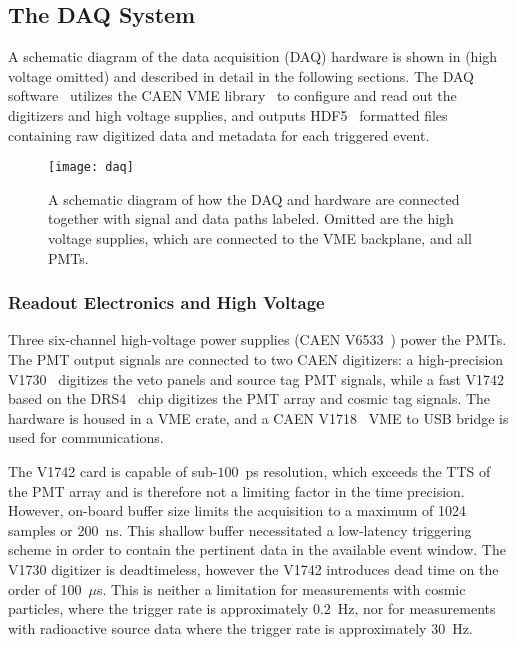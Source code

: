 \subsection{The DAQ System \label{sec:daq}}

A schematic diagram of the data acquisition (DAQ) hardware is shown in   (high voltage omitted) and described in detail in the following sections. 
The DAQ software~\cite{wblsdaq} utilizes the CAEN VME library~\cite{caen-vme} to configure and read out the digitizers and high voltage supplies, and outputs HDF5~\cite{hdf5} formatted files containing raw digitized data and metadata for each triggered event.

\begin{figure}
\centering
\texttt{[image: daq]}
\caption{A schematic diagram of how the DAQ and hardware are connected together with signal and data paths labeled. Omitted are the high voltage supplies, which are connected to the VME backplane, and all PMTs.}
\label{fig:daq}
\end{figure}


\subsubsection{Readout Electronics and High Voltage}
Three six-channel high-voltage power supplies (CAEN V6533~\cite{v6533}) power the PMTs. 
The PMT output signals are connected to two CAEN digitizers: a high-precision V1730~\cite{v1730} digitizes the veto panels and source tag PMT signals, while a fast V1742~\cite{v1742} based on the DRS4~\cite{drs4} chip digitizes the PMT array and cosmic tag signals.  The hardware is housed in a VME crate, and a CAEN V1718~\cite{v1718} VME to USB bridge is used for communications.  

The V1742 card is capable of sub-$100$~ps resolution, which exceeds the TTS of the PMT array and is therefore not a limiting factor in the time precision.  However, on-board buffer size limits the acquisition to a maximum of 1024 samples or 200~ns. This shallow buffer necessitated a low-latency triggering scheme in order to contain the pertinent data in the available event window. The V1730 digitizer is deadtimeless, however the V1742 introduces dead time on the order of 100~$\mu$s.  This is neither a limitation for measurements with cosmic particles, where the trigger rate is approximately $0.2$~Hz, nor for measurements with radioactive source data where the trigger rate is approximately $30$~Hz.  
  



